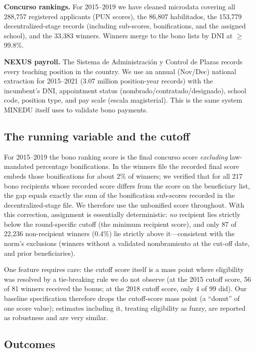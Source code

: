 \documentclass[11pt]{article}
\begin{document}
\textbf{Concurso rankings.} For 2015--2019 we have cleaned microdata covering
all 288,757 registered applicants (PUN scores), the 86,807 habilitados, the
153,779 decentralized-stage records (including sub-scores, bonifications, and
the assigned school), and the 33,383 winners. Winners merge to the bono lists
by DNI at $\geq$99.8\%.

\textbf{NEXUS payroll.} The Sistema de Administraci\'on y Control de Plazas
records every teaching position in the country. We use an annual (Nov/Dec)
national extraction for 2015--2021 (3.07 million position-year records) with
the incumbent's DNI, appointment status (nombrado/contratado/designado),
school code, position type, and pay scale (escala magisterial). This is the
same system MINEDU itself uses to validate bono payments.

\subsection{The running variable and the cutoff}

For 2015--2019 the bono ranking score is the final concurso score
\emph{excluding} law-mandated percentage bonifications. In the winners file
the recorded final score embeds those bonifications for about 2\% of winners;
we verified that for all 217 bono recipients whose recorded score differs from
the score on the beneficiary list, the gap equals exactly the sum of the
bonification sub-scores recorded in the decentralized-stage file. We therefore
use the unbonified score throughout. With this correction, assignment is
essentially deterministic: \emph{no} recipient lies strictly below the
round-specific cutoff (the minimum recipient score), and only 87 of 22,236
non-recipient winners (0.4\%) lie strictly above it---consistent with the
norm's exclusions (winners without a validated nombramiento at the cut-off
date, and prior beneficiaries).

One feature requires care: the cutoff score itself is a mass point where
eligibility was resolved by a tie-breaking rule we do not observe (at the 2015
cutoff score, 56 of 81 winners received the bonus; at the 2018 cutoff score,
only 4 of 99 did). Our baseline specification therefore drops the cutoff-score
mass point (a ``donut'' of one score value); estimates including it, treating
eligibility as fuzzy, are reported as robustness and are very similar.

\subsection{Outcomes}
\end{document}
